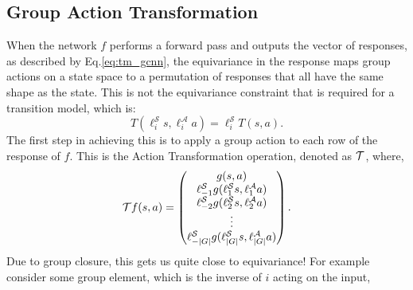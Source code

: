 \subsection{Group Action Transformation}
When the network $f$ performs a forward pass and outputs the vector of responses, as described by Eq.\ref{eq:tm_gcnn}, the equivariance in the response maps group actions on a state space to a permutation of responses that all have the same shape as the state. This is not the equivariance constraint that is required for a transition model, which is:
\begin{equation}
	T(\ell_i^\mathcal{S}s, \ell_i^\mathcal{A}a) = \ell_i^\mathcal{S}T(s, a).
\end{equation}
The first step in achieving this is to apply a group action to each row of the response of $f$. This is the Action Transformation operation, denoted as $\mathbf{\mathcal{T}}$, where,
\begin{equation}
	\mathbf{\mathcal{T}}f(s,a) = \begin{pmatrix}
		g(s, a)                                                          \\
		\ell_{-1}^\mathcal{S}g(\ell_1^\mathcal{S}s,\ell^\mathcal{A}_1a)  \\
		\ell_{-2}^\mathcal{S}g(\ell^\mathcal{S}_2s, \ell^\mathcal{A}_2a) \\
		\vdots                                                           \\
		\ell_{-|G|}^\mathcal{S}g(\ell_{|G|}^\mathcal{S}s, \ell^\mathcal{A}_{|G|}a)
	\end{pmatrix}.
\end{equation}
Due to group closure, this gets us quite close to equivariance! For example consider some group element, which is the inverse of $i$ acting on the input,

